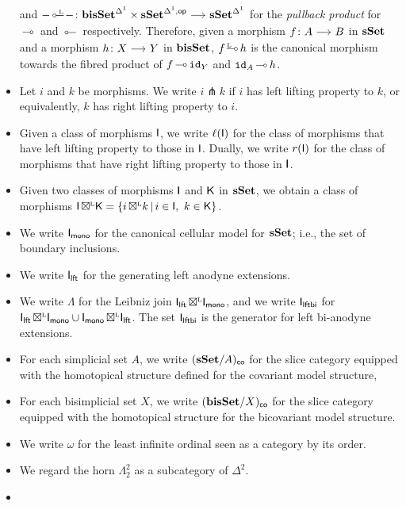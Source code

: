 \documentclass[a4paper,  dvipsnames, 11pt]{amsart}
\begin{document}
\begin{notation}
\begin{itemize}
			and
			$-\lollipopL-\colon\bisSet^\ra\times\sSet^{\ra,\op}\arr\sSet^\ra$
			for the \textit{pullback product} for $\rollipop$ and $\lollipop$ respectively.
			Therefore, given a morphism $f\colon A \arr B$ in $\mathbf{sSet}$ and a morphism $h\colon X\arr Y$ in $\mathbf{bisSet}$,
			$f\rollipopL h$ is the canonical morphism towards the fibred product of $f\rollipop \id_Y$ and $\id_A\rollipop h$.
		\item %
			Let $i$ and $k$ be morphisms.
			We write $i\pitchfork k$ if $i$ has left lifting property to $k$, or equivalently,
			$k$ has right lifting property to $i$.
		\item
			Given a class of morphisms $\mathsf{I}$,
			we write $\ell(\mathsf{I})$ for the class of morphisms that have left lifting property to those in $\mathsf{I}$.
			Dually, we write $r(\mathsf{I})$ for the class of morphisms that have right lifting property to those in $\mathsf{I}$.
		\item %
			Given two classes of morphisms $\mathsf{I}$ and $\mathsf{K}$ in $\mathbf{sSet}$,
			we obtain a class of morphisms $\mathsf{I}{\mathrel{\,\boxtimes^{\text{\tiny{L}}}}}\mathsf{K}=\{ i{\mathrel{\,\boxtimes^{\text{\tiny{L}}}}} k\,|\,i\in\mathsf{I},\ k\in\mathsf{K} \}$.
		\item %
			We write $\mathsf{I}_{\mathsf{mono}}$ for the canonical cellular model for $\mathbf{sSet}$; i.e., the set of boundary inclusions.
		\item %
			We write $\mathsf{I}_{\mathsf{lft}}$ for the generating left anodyne extensions.
		\item %
			We write $\Lambda$ for the Leibniz join $\mathsf{I}_{\mathsf{lft}}{\mathrel{\,\boxtimes^{\text{\tiny{L}}}}}\mathsf{I}_{\mathsf{mono}}$,
			and we write $\mathsf{I}_{\mathsf{lftbi}}$ for $\mathsf{I}_{\mathsf{lft}}{\mathrel{\,\boxtimes^{\text{\tiny{L}}}}}\mathsf{I}_{\mathsf{mono}}\cup\mathsf{I}_{\mathsf{mono}}{\mathrel{\,\boxtimes^{\text{\tiny{L}}}}}\mathsf{I}_{\mathsf{lft}}$.
			The set
			$\mathsf{I}_{\mathsf{lftbi}}$ is the generator for left bi-anodyne extensions.
		\item %
			For each simplicial set $A$,
			we write $(\mathbf{sSet}/A)_{\mathsf{co}}$ for the slice category equipped with the homotopical structure defined for the covariant model structure,
		\item %
			For each bisimplicial set $X$,
			we write $(\mathbf{bisSet}/X)_{\mathsf{co}}$ for the slice category equipped with the homotopical structure for the bicovariant model structure.
		\item %
			We write $\omega$ for the least infinite ordinal seen as a category by its order.
		\item %
			We regard the horn $\Lambda^2_2$ as a subcategory of $\Delta^2$.
		\item %
		\qedhere %
	\end{itemize}
\end{notation}
\end{document}
